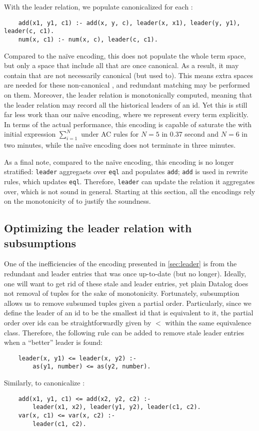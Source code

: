 With the leader relation, 
 we populate canonicalized \enodes 
 for each \enode:
\begin{verbatim}
    add(x1, y1, c1) :- add(x, y, c), leader(x, x1), leader(y, y1), leader(c, c1).
    num(x, c1) :- num(x, c), leader(c, c1).
\end{verbatim}
Compared to the na\"ive encoding,
 this does not populate the whole term space,
 but only a space that include all \enodes that are once canonical.
As a result,
 it may contain \enodes that are not necessarily canonical (but used to).
This means extra spaces are needed for these non-canonical \enodes,
 and redundant matching may be performed on them.
Moreover, the leader relation is monotonically computed,
 meaning that the leader relation may 
 record all the historical leaders of an \eclass id.
Yet this is still far less work than our na\"ive encoding, 
 where we represent every term explicitly.
In terms of the actual performance,
 this encoding is capable of saturate 
 the \egraph with initial expression $\sum_{i=1}^N$
 under AC rules for $N=5$ in 0.37 second
 and $N=6$ in two minutes, 
 while the na\"ive encoding does not terminate in three minutes.

As a final note,
 compared to the na\"ive encoding,
 this encoding is no longer stratified:
 \verb|leader| aggregaets over \verb|eql|
 and populates \verb|add|;
 \verb|add| is used in rewrite rules,
 which updates \verb|eql|.
Therefore, \verb|leader| can update the relation it aggregates over,
 which is not sound in general.
Starting at this section,
 all the encodings rely on the monotonicity of \egraphs to justify the soundness.

\subsection{Optimizing the leader relation with subsumptions}\label{sec:subsumption}

One of the inefficiencies of the encoding presented in \autoref{sec:leader} is 
 from the redundant \enodes and leader entries 
 that was once up-to-date (but no longer).
Ideally, one will want to get rid of these stale \enodes and leader entries,
 yet plain Datalog does not removal of tuples for the sake of monotonicity.
Fortunately,
 subsumption allows us to remove subsumed tuples given a partial order.
Particularly, 
 since we define the leader of an \eclass id to be the smallest id 
 that is equivalent to it,
 the partial order over \eclass ids can be straightforwardly given by $<$ 
 within the same equivalence class.
Therefore, the following rule can be added to remove stale leader entries 
 when a ``better'' leader is found:
\begin{verbatim}
    leader(x, y1) <= leader(x, y2) :-
        as(y1, number) <= as(y2, number).
\end{verbatim}
Similarly, to canonicalize \enodes:
\begin{verbatim}
    add(x1, y1, c1) <= add(x2, y2, c2) :-
        leader(x1, x2), leader(y1, y2), leader(c1, c2).
    var(x, c1) <= var(x, c2) :-
        leader(c1, c2).
\end{verbatim}

